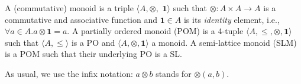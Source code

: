 \documentclass{llncs}
\def\1{{\mathbf 1}}
\newcommand{\comment}[1]{}
\def\monid{{\mathbf 0}}
\def\1{{\mathbf 1}}
\def\monop{\otimes}
\def\monid{\mathbf{1}}
\begin{document}
%



%
%

\begin{definition}\label{defn:clm}
	A (commutative) monoid is a triple
	$\langle A, \monop,$ $\1 \rangle$ such that $\monop: A \times A \rightarrow A$ is
	a commutative and associative function and $\1 \in A$ is its \emph{identity} element,
	i.e., $\forall a \in A. a \monop \1 = a$.
%	
	A partially ordered monoid (POM) is a 4-tuple $\langle A, {\leq,} \monop, \1 \rangle$ such that 	
	$\langle A, \leq \rangle$ is a PO and $\langle A, \monop, \1 \rangle$ a monoid.
	A semi-lattice monoid (SLM) is a 
	POM such that their underlying PO is a SL.
\end{definition}

As usual, we use the infix notation: $a \monop b$ stands for $\monop(a,b)$.
\comment{The monoidal operator can be defined for any multi-set: it is given 
for a family of elements $a_i \in A$ indexed over a non-empty finite
set $I$, and it is denoted by
$\bigotimes_{i \in I} a_i$.
%
If for an index set $I$ the $a_i$'s are different,
we write $\bigotimes S$ instead of $\bigotimes_{i \in I} a_i$
for the set $S = \{a_i \mid i \in I\}$.
%
Conventionally, we denote $\bigotimes \emptyset = \bot$.
}
\end{document}
